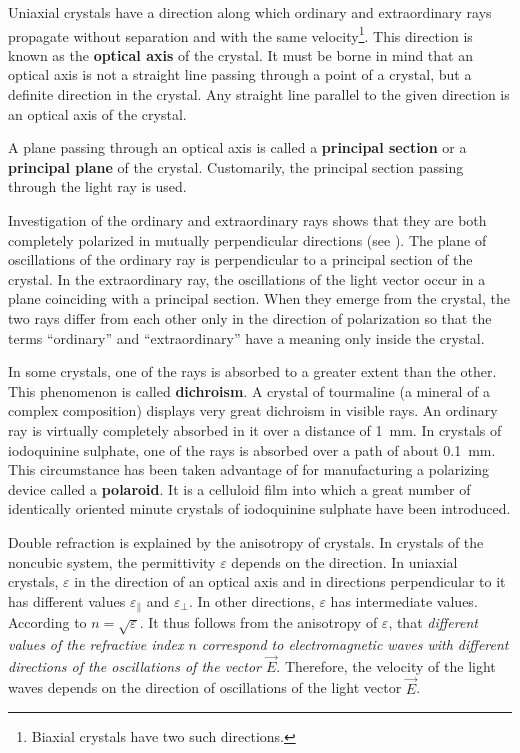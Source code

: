 Uniaxial crystals have a direction along which ordinary and extraordinary rays propagate without separation and with the same velocity\footnote{Biaxial crystals have two such directions.}.
This direction is known as the \textbf{optical axis} of the crystal.
It must be borne in mind that an optical axis is not a straight line passing through a point of a crystal, but a definite direction in the crystal.
Any straight line parallel to the given direction is an optical axis of the crystal.

A plane passing through an optical axis is called a \textbf{principal section} or a \textbf{principal plane} of the crystal. Customarily, the principal section passing through the light ray is used.

Investigation of the ordinary and extraordinary rays shows that they are both completely polarized in mutually perpendicular directions
(see ).
The plane of oscillations of the ordinary ray is perpendicular to a principal section of the crystal.
In the extraordinary ray, the oscillations of the light vector occur in a plane coinciding with a principal section.
When they emerge from the crystal, the two rays differ from each other only in the direction of polarization so that the terms ``ordinary'' and ``extraordinary'' have a meaning only inside the crystal.

In some crystals, one of the rays is absorbed to a greater extent than the other.
This phenomenon is called \textbf{dichroism}.
A crystal of tourmaline (a mineral of a complex composition) displays very great dichroism in visible rays.
An ordinary ray is virtually completely absorbed
in it over a distance of \SI{1}{\milli\metre}.
In crystals of iodoquinine sulphate, one of the rays is absorbed over a path of about \SI{0.1}{\milli\metre}.
This circumstance has been taken advantage of for manufacturing a polarizing device called a \textbf{polaroid}.
It is a celluloid film into which a great number of identically oriented minute crystals of iodoquinine sulphate have been introduced.

Double refraction is explained by the anisotropy
of crystals.
In crystals of the noncubic system, the permittivity $\varepsilon$ depends on the direction.
In uniaxial crystals, $\varepsilon$ in the direction of an optical axis and in directions perpendicular to it has different values $\varepsilon_{\parallel}$ and $\varepsilon_{\perp}$.
In other directions, $\varepsilon$ has intermediate values.
According to  $n=\sqrt{\varepsilon}$.
It thus follows from the anisotropy of $\varepsilon$, that \textit{different values of the refractive index $n$ correspond to electromagnetic waves with different directions of the oscillations of the vector $\vec{E}$}.
Therefore, the velocity of the light waves depends on the direction of oscillations of the light vector $\vec{E}$.

